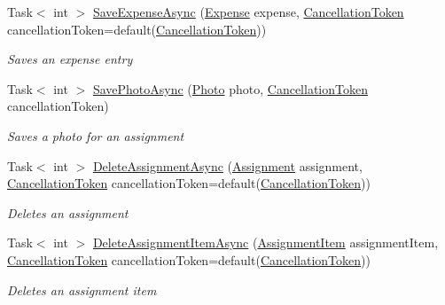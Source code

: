 \begin{DoxyCompactItemize}
Task$<$ int $>$ \hyperlink{class_field_service_1_1_data_1_1_sample_assignment_service_a50e16b32152afc2df3a24784a13d9d03}{Save\+Expense\+Async} (\hyperlink{class_field_service_1_1_data_1_1_expense}{Expense} expense, \hyperlink{_view_models_2_assignment_view_model_8cs_aba80ec766846c61f55644fd23860cb18}{Cancellation\+Token} cancellation\+Token=default(\hyperlink{_view_models_2_assignment_view_model_8cs_aba80ec766846c61f55644fd23860cb18}{Cancellation\+Token}))
\begin{DoxyCompactList}\small\item\em Saves an expense entry \end{DoxyCompactList}\item 
Task$<$ int $>$ \hyperlink{class_field_service_1_1_data_1_1_sample_assignment_service_ad323006946fd86667fe6e8f0c08bb7f6}{Save\+Photo\+Async} (\hyperlink{class_field_service_1_1_data_1_1_photo}{Photo} photo, \hyperlink{_view_models_2_assignment_view_model_8cs_aba80ec766846c61f55644fd23860cb18}{Cancellation\+Token} cancellation\+Token)
\begin{DoxyCompactList}\small\item\em Saves a photo for an assignment \end{DoxyCompactList}\item 
Task$<$ int $>$ \hyperlink{class_field_service_1_1_data_1_1_sample_assignment_service_aff0f9b0a08bb148d8068a42c90f8ef35}{Delete\+Assignment\+Async} (\hyperlink{class_field_service_1_1_data_1_1_assignment}{Assignment} assignment, \hyperlink{_view_models_2_assignment_view_model_8cs_aba80ec766846c61f55644fd23860cb18}{Cancellation\+Token} cancellation\+Token=default(\hyperlink{_view_models_2_assignment_view_model_8cs_aba80ec766846c61f55644fd23860cb18}{Cancellation\+Token}))
\begin{DoxyCompactList}\small\item\em Deletes an assignment \end{DoxyCompactList}\item 
Task$<$ int $>$ \hyperlink{class_field_service_1_1_data_1_1_sample_assignment_service_a7b77e5c259b671c6197dee3c71e7831c}{Delete\+Assignment\+Item\+Async} (\hyperlink{class_field_service_1_1_data_1_1_assignment_item}{Assignment\+Item} assignment\+Item, \hyperlink{_view_models_2_assignment_view_model_8cs_aba80ec766846c61f55644fd23860cb18}{Cancellation\+Token} cancellation\+Token=default(\hyperlink{_view_models_2_assignment_view_model_8cs_aba80ec766846c61f55644fd23860cb18}{Cancellation\+Token}))
\begin{DoxyCompactList}\small\item\em Deletes an assignment item \end{DoxyCompactList}\item 

\end{DoxyCompactItemize}
